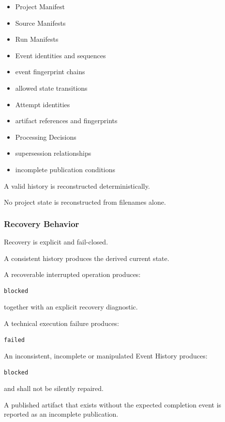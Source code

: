 \begin{itemize}
\tightlist
\item
  Project Manifest
\item
  Source Manifests
\item
  Run Manifests
\item
  Event identities and sequences
\item
  event fingerprint chains
\item
  allowed state transitions
\item
  Attempt identities
\item
  artifact references and fingerprints
\item
  Processing Decisions
\item
  supersession relationships
\item
  incomplete publication conditions
\end{itemize}

A valid history is reconstructed deterministically.

No project state is reconstructed from filenames alone.

\hypertarget{recovery-behavior}{%
\subsubsection{Recovery Behavior}\label{recovery-behavior}}

Recovery is explicit and fail-closed.

A consistent history produces the derived current state.

A recoverable interrupted operation produces:

\begin{verbatim}
blocked
\end{verbatim}

together with an explicit recovery diagnostic.

A technical execution failure produces:

\begin{verbatim}
failed
\end{verbatim}

An inconsistent, incomplete or manipulated Event History produces:

\begin{verbatim}
blocked
\end{verbatim}

and shall not be silently repaired.

A published artifact that exists without the expected completion event is reported as an incomplete publication.

